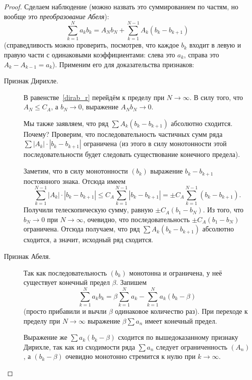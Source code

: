 \begin{proof}
	Сделаем наблюдение (можно назвать это суммированием по частям, но вообще это \textit{преобразование Абеля}):
	\begin{equation} \label{dirab_r}
		\sum_{k=1}^N a_k b_k = A_N b_N + \sum_{k=1}^{N-1} A_k (b_k - b_{k+1})
	\end{equation}
	(справедливость можно проверить, посмотрев, что каждое \(b_k\) входит в левую и правую части с одинаковыми коэффициентами: слева это \(a_k\), справа это \(A_k - A_{k-1} = a_k\)). Применим его для доказательства признаков:
	\begin{description}
		\item[Признак Дирихле.] В равенстве~\eqref{dirab_r} перейдём к пределу при \(N \to \infty\). В силу того, что \(A_N \leqslant C_A\), а \(b_N \to 0\), выражение \(A_N b_N \to 0\).
		
		Мы также заявляем, что ряд \(\sum A_k (b_k - b_{k+1})\) абсолютно сходится. Почему? Проверим, что последовательность частичных сумм ряда  \(\sum |A_k| \cdot |b_k - b_{k+1}|\) ограничена (из этого в силу монотонности этой последовательности будет следовать существование конечного предела).
		
		Заметим, что в силу монотонности \((b_k)\) выражение \(b_k - b_{k+1}\) постоянного знака. Отсюда имеем \[
			\sum_{k=1}^{N-1} |A_k| \cdot |b_k - b_{k+1}| \leqslant C_A \sum_{k=1}^{N-1} |b_k - b_{k+1}| = \pm C_A \sum_{k=1}^{N-1} (b_k - b_{k+1}).
		\]
		Получили телескопическую сумму, равную \(\pm C_A (b_1 - b_N)\). Из того, что \(b_N \to 0\) при  \(N \to \infty\), очевидно, что последовательность \(\pm C_A (b_1 - b_N)\) ограничена. Отсюда получаем, что ряд \(\sum A_k (b_k - b_{k+1})\) абсолютно сходится, а значит, исходный ряд сходится.
		\item[Признак Абеля.] Так как последовательность \((b_k)\) монотонна и ограничена, у неё существует конечный предел \(\beta\). Запишем \[
			\sum_{k=1}^N a_k b_k = \beta \sum_{k=1}^N a_k - \sum_{k=1}^N a_k (b_k - \beta)
		\]
		(просто прибавили и вычли \(\beta\) одинаковое количество раз). При переходе к пределу при  \(N \to \infty\) выражение \(\beta \sum a_n\) имеет конечный предел.
		
		Выражение же  \(\sum a_k (b_k - \beta)\) сходится по вышедоказанному признаку Дирихле, так как из сходимости ряда \(\sum a_n\) следует ограниченность \((A_n)\), а \((b_k - \beta)\) очевидно монотонно стремится к нулю при \(k \to \infty\).
	\end{description}
\end{proof}

